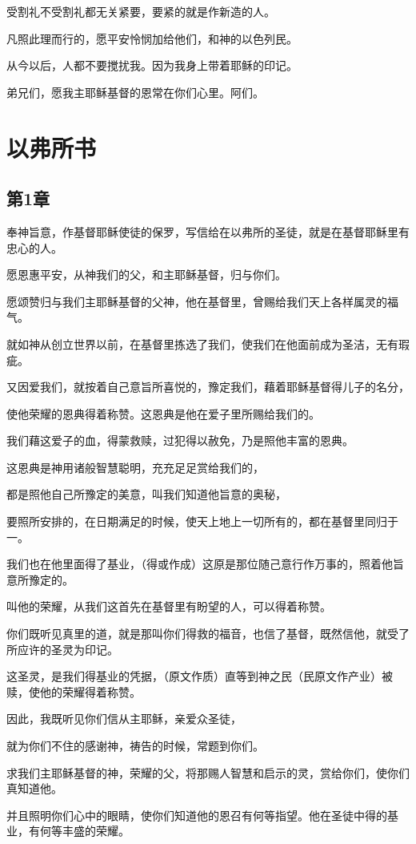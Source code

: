 \documentclass[12pt,oneside]{book}
\begin{document}
受割礼不受割礼都无关紧要，要紧的就是作新造的人。

凡照此理而行的，愿平安怜悯加给他们，和神的以色列民。

从今以后，人都不要搅扰我。因为我身上带着耶稣的印记。

弟兄们，愿我主耶稣基督的恩常在你们心里。阿们。

\part{以弗所书}
\chapter{第1章}
奉神旨意，作基督耶稣使徒的保罗，写信给在以弗所的圣徒，就是在基督耶稣里有忠心的人。

愿恩惠平安，从神我们的父，和主耶稣基督，归与你们。

愿颂赞归与我们主耶稣基督的父神，他在基督里，曾赐给我们天上各样属灵的福气。

就如神从创立世界以前，在基督里拣选了我们，使我们在他面前成为圣洁，无有瑕疵。

又因爱我们，就按着自己意旨所喜悦的，豫定我们，藉着耶稣基督得儿子的名分，

使他荣耀的恩典得着称赞。这恩典是他在爱子里所赐给我们的。

我们藉这爱子的血，得蒙救赎，过犯得以赦免，乃是照他丰富的恩典。

这恩典是神用诸般智慧聪明，充充足足赏给我们的，

都是照他自己所豫定的美意，叫我们知道他旨意的奥秘，

要照所安排的，在日期满足的时候，使天上地上一切所有的，都在基督里同归于一。

我们也在他里面得了基业，（得或作成）这原是那位随己意行作万事的，照着他旨意所豫定的。

叫他的荣耀，从我们这首先在基督里有盼望的人，可以得着称赞。

你们既听见真里的道，就是那叫你们得救的福音，也信了基督，既然信他，就受了所应许的圣灵为印记。

这圣灵，是我们得基业的凭据，（原文作质）直等到神之民（民原文作产业）被赎，使他的荣耀得着称赞。

因此，我既听见你们信从主耶稣，亲爱众圣徒，

就为你们不住的感谢神，祷告的时候，常题到你们。

求我们主耶稣基督的神，荣耀的父，将那赐人智慧和启示的灵，赏给你们，使你们真知道他。

并且照明你们心中的眼睛，使你们知道他的恩召有何等指望。他在圣徒中得的基业，有何等丰盛的荣耀。
\end{document}
